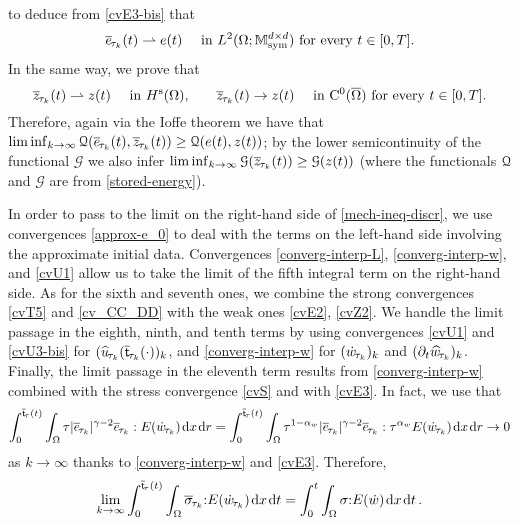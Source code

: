 \documentclass[a4paper,10pt,reqno]{amsart}
\numberwithin{equation}{section}
\newcommand{\bbM}{\mathbb{M}}
\numberwithin{equation}{section}
\newcommand{\weakto}{\rightharpoonup} %
\def\calG{{\mathcal G}} \def\calH{{\mathcal H}} \def\calI{{\mathcal I}}
\def\dd{\;\!\mathrm{d}} %
\newcommand{\piecewiseConstant}[2]{\overline{#1}_{\kern-1pt#2}}
\newcommand{\pwc}{\piecewiseConstant}
\newcommand{\piecewiseLinear}[2]{{#1}_{\kern-1pt#2}}
\newcommand{\pwl}{\piecewiseLinear}
\newcommand{\pwwll}[2]{\widehat{#1}_{\kern-1pt#2}}
\newcommand{\sig}[1]{E(#1)}
\newcommand{\mt}{\bbM}
\newcommand{\sym}{\mathrm{sym}}
\newcommand{\spz}{H^{\mathrm{s}}(\Omega)}
\newcommand{\EEE}{\color{black}}
\newcommand{\MMM}{\color{black}}%
\begin{document}
  to deduce from \eqref{cvE3-bis} that 
  \begin{equation}
  \label{pointwise-weak-e}
   \pwc e{\tau_k}(t) \weakto e(t) \quad \text{ in $L^2(\Omega;\mt_\sym^{d\times d})$ for every $t \in [0,T]$}.
  \end{equation}
  In the same way, we prove that 
  \begin{equation}
  \label{pointwise-strong-z}
   \pwc z{\tau_k}(t) \weakto z(t)  \quad \text{ in $\spz$,} \qquad 
  \pwc z{\tau_k}(t) \to z(t) \quad \text{ in $\rmC^0(\overline\Omega)$ for every $t \in [0,T]$.}
  \end{equation}  
  Therefore, again via the Ioffe theorem  we have that 
  $\liminf_{k\to\infty} \calQ( \pwc e{\tau_k}(t),  \pwc z{\tau_k}(t)) \geq \calQ(e(t),z(t))$;
  by the lower semicontinuity of the functional $\calG$ we also infer
  $\liminf_{k\to\infty} \calG(\pwc z{\tau_k}(t)) \geq \calG(z(t))$
   \MMM (where the functionals ${\mathcal Q}$ and $\calG$ are from \eqref{stored-energy}). \EEE
  \par
  In order to pass to the limit on the right-hand side of  \eqref{mech-ineq-discr}, 
 we use convergences \eqref{approx-e_0}     to deal with the terms on 
  the left-hand side involving the  approximate initial data. 
  Convergences \eqref{converg-interp-L}, \eqref{converg-interp-w},  and \eqref{cvU1} allow us to take the limit
  of the fifth integral term on the right-hand side. As for the sixth and seventh ones, we combine the 
  strong convergences \eqref{cvT5} and
   \eqref{cv_CC_DD}  with the weak ones \eqref{cvE2}, \eqref{cvZ2}. 
   We handle the limit passage in the eighth, ninth, and tenth terms 
   by using convergences \eqref{cvU1} and \eqref{cvU3-bis} for $(\pwwll { u}{\tau_k}(\pwc {\mathsf{t}}{\tau_k}(\cdot))_k$,
   and  \eqref{converg-interp-w} for $(\pwl {\dot w}{\tau_k})_k$ and  $(\partial_t\pwwll {w}{\tau_k})_k$.
   Finally, the limit passage in the eleventh term results from  \eqref{converg-interp-w}
    combined with the stress convergence \eqref{cvS} and with \eqref{cvE3}.
    In fact, we use that 
    \[
     \int_{0}^{\pwc{\mathsf{t}}{\tau}(t)} \int_\Omega  \tau |\pwc e{\tau_k}|^{\gamma-2} \pwc e{\tau_k} : \sig{\pwl {\dot w}{\tau_k}} \dd x \dd r
     = \int_{0}^{\pwc{\mathsf{t}}{\tau}(t)} \int_\Omega  \tau^{1-\alpha_w} |\pwc e{\tau_k}|^{\gamma-2} \pwc e{\tau_k} : \tau^{\alpha_w}\sig{\pwl {\dot w}{\tau_k}} \dd x \dd r  \to 0
     \] 
     as $k\to\infty$ thanks to \eqref{converg-interp-w} and  \eqref{cvE3}.
    Therefore,
    \begin{equation}
    \label{houston}
     \lim_{k\to\infty}   \int_{0}^{\pwc{\mathsf{t}}{\tau}(t)} \int_\Omega 
     \pwc \sigma{\tau_k} {:} \sig{\pwl {\dot w}{\tau_k}} \dd x \dd t 
     = \int_0^t \int_\Omega \sigma {:} \sig{\dot w} \dd x \dd t\,.
    \end{equation}
\end{document}
